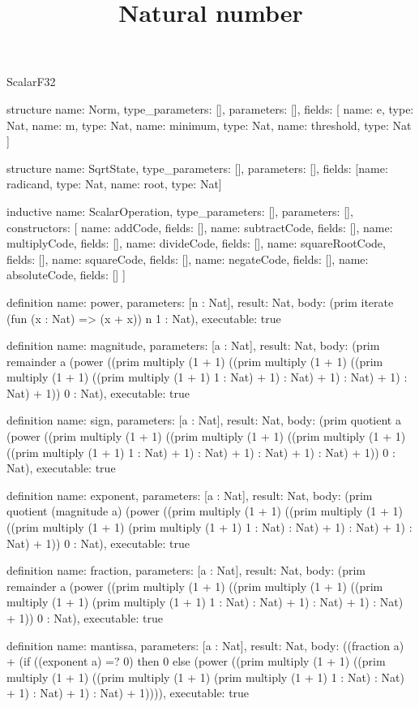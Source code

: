 \begin{lexlean}{ScalarF32}
\title{Natural number}
\begin{semanticmodule}
structure{
  name: Norm,
  type_parameters: [],
  parameters: [],
  fields: [
    {name: e, type: Nat},
    {name: m, type: Nat},
    {name: minimum, type: Nat},
    {name: threshold, type: Nat}
  ]
}

structure{
  name: SqrtState,
  type_parameters: [],
  parameters: [],
  fields: [{name: radicand, type: Nat}, {name: root, type: Nat}]
}

inductive{
  name: ScalarOperation,
  type_parameters: [],
  parameters: [],
  constructors: [
    {name: addCode, fields: []},
    {name: subtractCode, fields: []},
    {name: multiplyCode, fields: []},
    {name: divideCode, fields: []},
    {name: squareRootCode, fields: []},
    {name: squareCode, fields: []},
    {name: negateCode, fields: []},
    {name: absoluteCode, fields: []}
  ]
}

definition{
  name: power,
  parameters: [n : Nat],
  result: Nat,
  body: (prim iterate (fun (x : Nat) => (x + x)) n 1 : Nat),
  executable: true
}

definition{
  name: magnitude,
  parameters: [a : Nat],
  result: Nat,
  body: (prim remainder a (power ((prim multiply (1 + 1) ((prim multiply (1 + 1) ((prim multiply (1 + 1) ((prim multiply (1 + 1) 1 : Nat) + 1) : Nat) + 1) : Nat) + 1) : Nat) + 1)) 0 : Nat),
  executable: true
}

definition{
  name: sign,
  parameters: [a : Nat],
  result: Nat,
  body: (prim quotient a (power ((prim multiply (1 + 1) ((prim multiply (1 + 1) ((prim multiply (1 + 1) ((prim multiply (1 + 1) 1 : Nat) + 1) : Nat) + 1) : Nat) + 1) : Nat) + 1)) 0 : Nat),
  executable: true
}

definition{
  name: exponent,
  parameters: [a : Nat],
  result: Nat,
  body: (prim quotient (magnitude a) (power ((prim multiply (1 + 1) ((prim multiply (1 + 1) ((prim multiply (1 + 1) (prim multiply (1 + 1) 1 : Nat) : Nat) + 1) : Nat) + 1) : Nat) + 1)) 0 : Nat),
  executable: true
}

definition{
  name: fraction,
  parameters: [a : Nat],
  result: Nat,
  body: (prim remainder a (power ((prim multiply (1 + 1) ((prim multiply (1 + 1) ((prim multiply (1 + 1) (prim multiply (1 + 1) 1 : Nat) : Nat) + 1) : Nat) + 1) : Nat) + 1)) 0 : Nat),
  executable: true
}

definition{
  name: mantissa,
  parameters: [a : Nat],
  result: Nat,
  body: ((fraction a) + (if ((exponent a) =? 0) then 0 else (power ((prim multiply (1 + 1) ((prim multiply (1 + 1) ((prim multiply (1 + 1) (prim multiply (1 + 1) 1 : Nat) : Nat) + 1) : Nat) + 1) : Nat) + 1)))),
  executable: true
}


\end{semanticmodule}
\end{lexlean}
